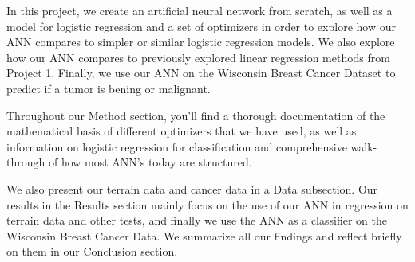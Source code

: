 In this project, we create an artificial neural network from scratch, as well as a model for logistic regression and a set of optimizers 
in order to explore how our ANN compares to simpler or similar logistic regression models. We also explore how our ANN compares to previously 
explored linear regression methods from Project 1. Finally, we use our ANN on the Wisconsin Breast Cancer Dataset to predict if a
tumor is bening or malignant. 

Throughout our Method section, you'll find a thorough documentation of the mathematical basis of different optimizers
that we have used, as well as information on logistic regression for classification and comprehensive walk-through of how most ANN's today are structured.

We also present our terrain data and cancer data in a Data subsection. Our results in the Results section mainly focus on the use of our ANN 
in regression on terrain data and other tests, and finally we use the ANN as a classifier on the Wisconsin Breast Cancer Data. We summarize all our 
findings and reflect briefly on them in our Conclusion section. 




